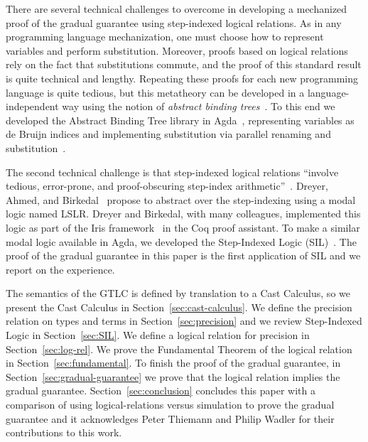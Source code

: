 \documentclass[submission,copyright,creativecommons]{eptcs}
\begin{document}
There are several technical challenges to overcome in developing a
mechanized proof of the gradual guarantee using step-indexed logical
relations. As in any programming language mechanization, one must
choose how to represent variables and perform substitution. Moreover,
proofs based on logical relations rely on the fact that substitutions
commute, and the proof of this standard result is quite technical and
lengthy. Repeating these proofs for each new programming language is
quite tedious, but this metatheory can be developed in a
language-independent way using the notion of \emph{abstract binding
  trees}~\cite{Harper:2012aa}. To this end we developed the Abstract
Binding Tree library in Agda~\cite{Siek:2021to}, representing
variables as de Bruijn indices and implementing substitution via
parallel renaming and
substitution~\cite{McBride:2005aa,Wadler:2020aa}.

The second technical challenge is that step-indexed logical relations
``involve tedious, error-prone, and proof-obscuring step-index
arithmetic''~\cite{Dreyer:2011wl}. Dreyer, Ahmed, and
Birkedal~\cite{Dreyer:2011wl} propose to abstract over the
step-indexing using a modal logic named LSLR. Dreyer and Birkedal,
with many colleagues, implemented this logic as part of the Iris
framework~\cite{JUNG:2018aa} in the Coq proof assistant. To make a
similar modal logic available in Agda, we developed the Step-Indexed
Logic (SIL)~\cite{Siek:2023aa}.  The proof of the gradual guarantee in
this paper is the first application of SIL and we report on the
experience.

The semantics of the GTLC is defined by translation to a Cast
Calculus, so we present the Cast Calculus in
Section~\ref{sec:cast-calculus}. We define the precision relation on
types and terms in Section~\ref{sec:precision} and we review
Step-Indexed Logic in Section~\ref{sec:SIL}.  We define a logical
relation for precision in Section~\ref{sec:log-rel}. We prove the
Fundamental Theorem of the logical relation in
Section~\ref{sec:fundamental}. To finish the proof of the gradual
guarantee, in Section~\ref{sec:gradual-guarantee} we prove that the
logical relation implies the gradual
guarantee. Section~\ref{sec:conclusion} concludes this paper with a
comparison of using logical-relations versus simulation to prove the
gradual guarantee and it acknowledges Peter Thiemann and Philip Wadler
for their contributions to this work.







\end{document}
